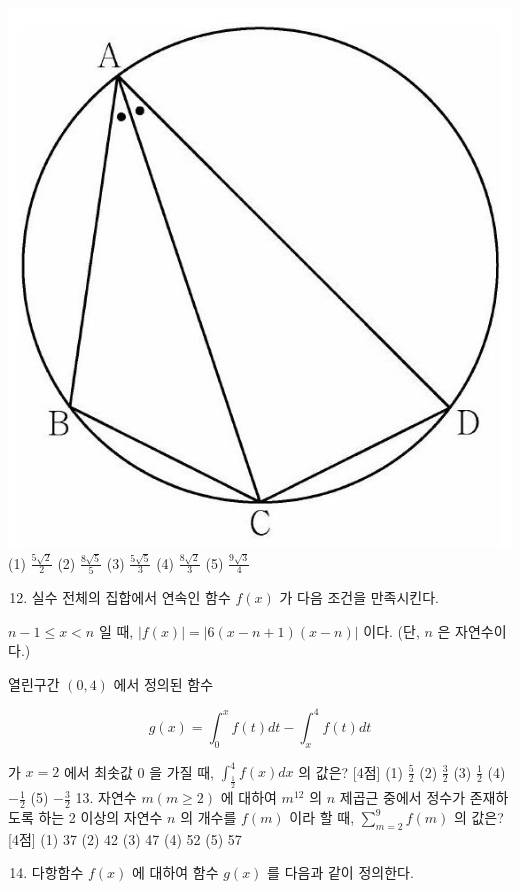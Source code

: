 \documentclass[10pt]{article}
\begin{document}
\includegraphics[max width=\textwidth, center]{2023_06_06_b380aa8523ec7afae994g-24}
(1) $\frac{5 \sqrt{2}}{2}$
(2) $\frac{8 \sqrt{5}}{5}$
(3) $\frac{5 \sqrt{5}}{3}$
(4) $\frac{8 \sqrt{2}}{3}$
(5) $\frac{9 \sqrt{3}}{4}$

\begin{enumerate}
  \setcounter{enumi}{11}
  \item 실수 전체의 집합에서 연속인 함수 $f(x)$ 가 다음 조건을 만족시킨다.
\end{enumerate}

$n-1 \leq x<n$ 일 때, $|f(x)|=|6(x-n+1)(x-n)|$ 이다. (단, $n$ 은 자연수이다.)

열린구간 $(0,4)$ 에서 정의된 함수

$$
g(x)=\int_{0}^{x} f(t) d t-\int_{x}^{4} f(t) d t
$$

가 $x=2$ 에서 최솟값 0 을 가질 때, $\int_{\frac{1}{2}}^{4} f(x) d x$ 의 값은? [4점]
(1) $\frac{5}{2}$
(2) $\frac{3}{2}$
(3) $\frac{1}{2}$
(4) $-\frac{1}{2}$
(5) $-\frac{3}{2}$ 13. 자연수 $m(m \geq 2)$ 에 대하여 $m^{12}$ 의 $n$ 제곱근 중에서 정수가 존재하도록 하는 2 이상의 자연수 $n$ 의 개수를 $f(m)$ 이라 할 때, $\sum_{m=2}^{9} f(m)$ 의 값은? [4점]
(1) 37
(2) 42
(3) 47
(4) 52
(5) 57

\begin{enumerate}
  \setcounter{enumi}{13}
  \item 다항함수 $f(x)$ 에 대하여 함수 $g(x)$ 를 다음과 같이 정의한다.
\end{enumerate}
\end{document}
